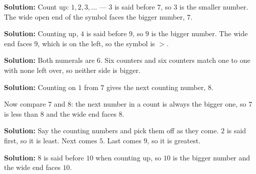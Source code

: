 \documentclass[12pt]{article}
\begin{document}




\textbf{Solution:} Count up: $1, 2, 3, \dots$ --- $3$ is said before $7$, so $3$ is the smaller number. The wide open end of the symbol faces the bigger number, $7$. 


\textbf{Solution:} Counting up, $4$ is said before $9$, so $9$ is the bigger number. The wide end faces $9$, which is on the left, so the symbol is $>$. 


\textbf{Solution:} Both numerals are $6$. Six counters and six counters match one to one with none left over, so neither side is bigger. 


\textbf{Solution:} Counting on $1$ from $7$ gives the next counting number, $8$. 

Now compare $7$ and $8$: the next number in a count is always the bigger one, so $7$ is less than $8$ and the wide end faces $8$. 


\textbf{Solution:} Say the counting numbers and pick them off as they come. $2$ is said first, so it is least. Next comes $5$. Last comes $9$, so it is greatest. 


\textbf{Solution:} $8$ is said before $10$ when counting up, so $10$ is the bigger number and the wide end faces $10$. 
\end{document}
